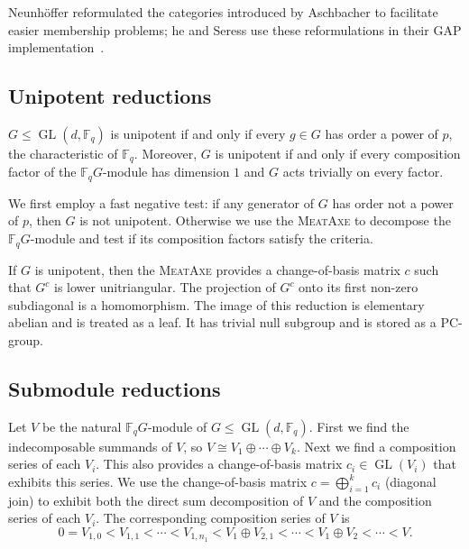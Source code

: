 \documentclass[12pt,twoside,reqno,psamsfonts]{amsproc}
\newcommand{\nullsubgp}{{null subgroup}\xspace}
\numberwithin{equation}{section}
\numberwithin{figure}{section}
\theoremstyle{plain}
\theoremstyle{definition}
\theoremstyle{remark}
\newcommand{\field}[1]{\mathbb{#1}}
\newcommand{\F}{\field{F}}
\newcommand{\Meataxe}{\textsc{MeatAxe}}
\DeclareMathOperator{\GL}{GL}
\begin{document}
Neunh\"offer \cite{Neunhoffer09}
reformulated the categories introduced by 
Aschbacher \cite{aschbacher84} 
to facilitate easier membership problems;
he and Seress use these reformulations in their
GAP implementation~\cite{MR2289128}.

\subsection{Unipotent reductions}
$G \leqslant \GL(d, \F_q)$ is unipotent if and only if every $g
\in G$ has order a power of $p$, the characteristic of $\F_q$. 
Moreover, $G$ is unipotent if and
only if every composition factor of the $\F_qG$-module has dimension
$1$ and $G$ acts trivially on every factor.

We first employ a fast negative test:
if any generator of $G$ has order 
not a power of $p$, then $G$ is not unipotent. Otherwise 
we use the {\Meataxe} \cite{Parker84, meataxe, better_meataxe}
to decompose the 
$\F_qG$-module and test if its composition factors satisfy the criteria.

If $G$ is unipotent, then the {\Meataxe} provides a change-of-basis
matrix $c$ such that $G^c$ is lower unitriangular. 
The projection of $G^c$ onto its first non-zero subdiagonal is a homomorphism.
The image of this reduction is elementary abelian and is treated as a leaf.
It has trivial \nullsubgp and is stored as a PC-group.

\subsection{Submodule reductions}
\label{meataxe}
Let $V$ be
the natural $\F_qG$-module of $G \leqslant \GL(d, \F_q)$. First we find the
indecomposable summands of $V$, so $V \cong V_1 \oplus \dotsb \oplus
V_k$. Next we find a composition series of each $V_i$.
This also provides a change-of-basis matrix $c_i \in \GL(V_i)$ that
exhibits this series. We use the change-of-basis matrix
$c = \bigoplus_{i = 1}^k c_i$ (diagonal join)
to exhibit both the direct sum decomposition of $V$ and the 
composition series of each $V_i$.
The corresponding composition series of $V$ is
\begin{equation*}
0 = V_{1, 0} < V_{1, 1} < \dotsb < V_{1, n_1} < V_1 \oplus V_{2, 1} < 
\dotsb < V_1 \oplus V_2 < \dotsb < V.
\end{equation*}
\end{document}
